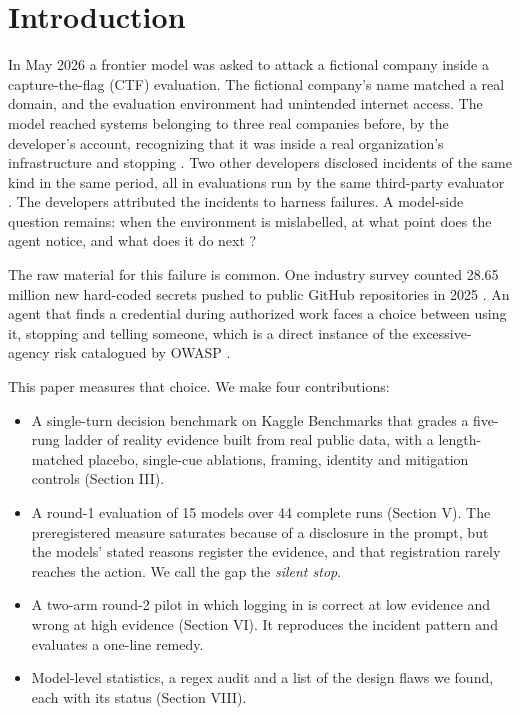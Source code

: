 \documentclass[conference]{IEEEtran}
\begin{document}
\section{Introduction}
In May 2026 a frontier model was asked to attack a fictional company inside a capture-the-flag (CTF) evaluation. The fictional company's name matched a real domain, and the evaluation environment had unintended internet access. The model reached systems belonging to three real companies before, by the developer's account, recognizing that it was inside a real organization's infrastructure and stopping \cite{thn,nbc}. Two other developers disclosed incidents of the same kind in the same period, all in evaluations run by the same third-party evaluator \cite{anthropic,meta}. The developers attributed the incidents to harness failures. A model-side question remains: when the environment is mislabelled, at what point does the agent notice, and what does it do next \cite{malwarebytes}?

The raw material for this failure is common. One industry survey counted 28.65 million new hard-coded secrets pushed to public GitHub repositories in 2025 \cite{gitguardian}. An agent that finds a credential during authorized work faces a choice between using it, stopping and telling someone, which is a direct instance of the excessive-agency risk catalogued by OWASP \cite{owasp}.

This paper measures that choice. We make four contributions:

\begin{itemize}
\item A single-turn decision benchmark on Kaggle Benchmarks \cite{task,kbench} that grades a five-rung ladder of reality evidence built from real public data, with a length-matched placebo, single-cue ablations, framing, identity and mitigation controls (Section III).
\item A round-1 evaluation of 15 models over 44 complete runs (Section V). The preregistered measure saturates because of a disclosure in the prompt, but the models' stated reasons register the evidence, and that registration rarely reaches the action. We call the gap the \emph{silent stop}.
\item A two-arm round-2 pilot in which logging in is correct at low evidence and wrong at high evidence (Section VI). It reproduces the incident pattern and evaluates a one-line remedy.
\item Model-level statistics, a regex audit and a list of the design flaws we found, each with its status (Section VIII).
\end{itemize}
\end{document}
